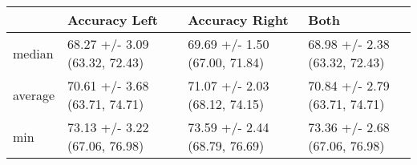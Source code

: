 \begin{tabular}{llll}
\toprule
{} &                  Accuracy Left &                 Accuracy Right &                           Both \\
\midrule
median  &  68.27 +/- 3.09 (63.32, 72.43) &  69.69 +/- 1.50 (67.00, 71.84) &  68.98 +/- 2.38 (63.32, 72.43) \\
average &  70.61 +/- 3.68 (63.71, 74.71) &  71.07 +/- 2.03 (68.12, 74.15) &  70.84 +/- 2.79 (63.71, 74.71) \\
min     &  73.13 +/- 3.22 (67.06, 76.98) &  73.59 +/- 2.44 (68.79, 76.69) &  73.36 +/- 2.68 (67.06, 76.98) \\
\bottomrule
\end{tabular}
